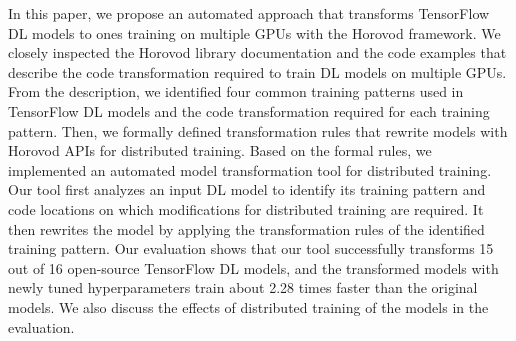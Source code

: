 

In this paper, we propose an automated approach that transforms TensorFlow DL
models to ones training on multiple GPUs with the Horovod framework.
We closely inspected the Horovod library documentation and the code examples
that describe the code transformation required to train DL models on multiple
GPUs.
From the description, we identified four common training patterns used in
TensorFlow DL models and the code transformation required for each training
pattern.
Then, we formally defined transformation rules that rewrite models with Horovod
APIs for distributed training.
Based on the formal rules, we implemented an automated model transformation
tool for distributed training.
Our tool first analyzes an input DL model to identify its training
pattern and code locations on which modifications for distributed training
are required.
It then rewrites the model by applying the transformation rules of the
identified training pattern.
Our evaluation shows that our tool successfully transforms 15 out of 16
open-source TensorFlow DL models, and the transformed models with newly tuned
hyperparameters train about 2.28 times faster than the original models.
We also discuss the effects of distributed training of the models in the
evaluation.



